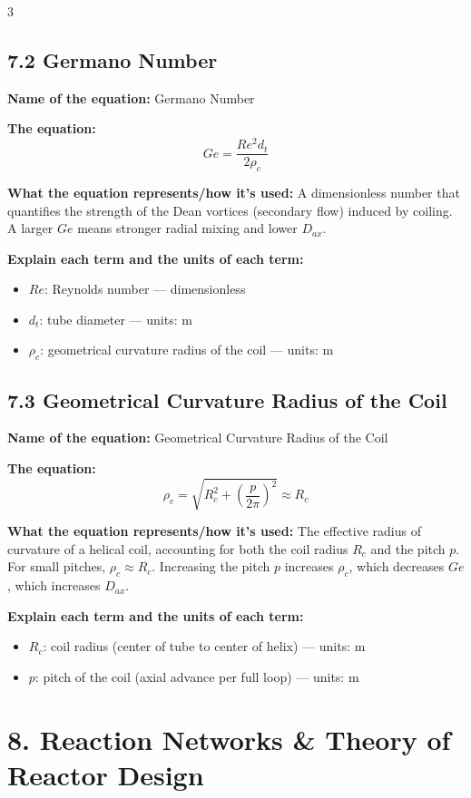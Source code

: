 \documentclass[8pt]{extarticle}
\begin{document}
\begin{multicols*}{3}
\subsection*{7.2 Germano Number}

\textbf{Name of the equation:} Germano Number

\textbf{The equation:}
\[
Ge=\frac{Re^2d_t}{2\rho_c}
\]

\textbf{What the equation represents/how it's used:} A dimensionless number that quantifies the strength of the Dean vortices (secondary flow) induced by coiling. A larger \(Ge\) means stronger radial mixing and lower \(D_{ax}\).

\textbf{Explain each term and the units of each term:}
\begin{itemize}
\item \(Re\): Reynolds number --- dimensionless
\item \(d_t\): tube diameter --- units: \(\mathrm{m}\)
\item \(\rho_c\): geometrical curvature radius of the coil --- units: \(\mathrm{m}\)
\end{itemize}

\subsection*{7.3 Geometrical Curvature Radius of the Coil}

\textbf{Name of the equation:} Geometrical Curvature Radius of the Coil

\textbf{The equation:}
\[
\rho_c=\sqrt{R_c^2+\left(\frac{p}{2\pi}\right)^2}\approx R_c
\]

\textbf{What the equation represents/how it's used:} The effective radius of curvature of a helical coil, accounting for both the coil radius \(R_c\) and the pitch \(p\). For small pitches, \(\rho_c\approx R_c\). Increasing the pitch \(p\) increases \(\rho_c\), which decreases \(Ge\), which increases \(D_{ax}\).

\textbf{Explain each term and the units of each term:}
\begin{itemize}
\item \(R_c\): coil radius (center of tube to center of helix) --- units: \(\mathrm{m}\)
\item \(p\): pitch of the coil (axial advance per full loop) --- units: \(\mathrm{m}\)
\end{itemize}

\section*{8. Reaction Networks \& Theory of Reactor Design}


\end{multicols*}
\end{document}
